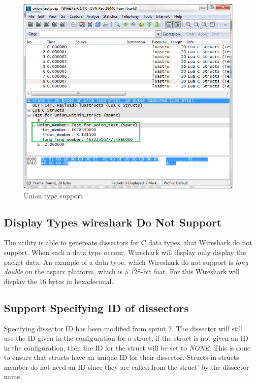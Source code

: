 \begin{figure}[ht]
	\center
	\includegraphics[width=\textwidth]{./sprints/img/wireshark_union}
	\caption{Union type support\label{fig:wsunion}}
\end{figure}



\subsection{Display Types \Gls{wireshark} Do Not Support}
The utility is able to genereate dissectors for C data types, that Wireshark 
do not support. When such a data type occour, Wireshark will display only 
display the packet data. An example of a data type, which Wireshark do not 
support is \emph{long double} on the \gls{asparc} platform, which is a 128-bit foat. 
For this Wireshark will display the 16 bytes in hexadecimal.

\subsection{Support Specifying ID of \Glspl{dissector}}
Specifying \gls{dissector} ID has been modified from sprint 2. The \gls{dissector} will 
still use the ID given in the configuration for a struct, if the struct is not 
given an ID in the configuration, then the ID for the struct will be set to 
\emph{NONE}. This is done to ensure that structs have an unique ID for their 
\gls{dissector}. Structs-in-structs member do not need an ID since they are called 
from the struct' by the \gls{dissector} name.

